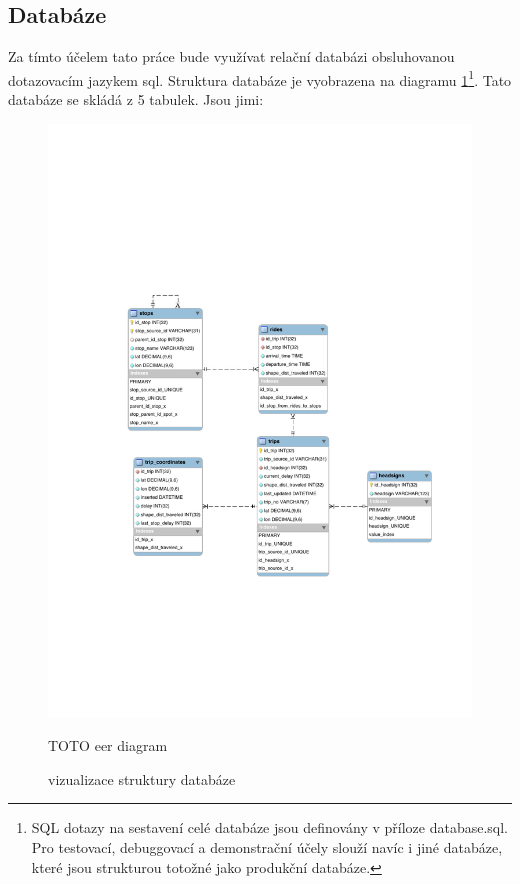 \subsection{Databáze} \label{subsection:databaze}


Za tímto účelem tato práce bude využívat relační databázi obsluhovanou dotazovacím jazykem \gls{sql}. Struktura databáze je vyobrazena na diagramu \ref{obr:EER}\footnote{SQL dotazy na sestavení celé databáze jsou definovány v příloze database.sql. Pro testovací, debuggovací a demonstrační účely slouží navíc i jiné databáze, které jsou strukturou totožné jako produkční databáze.}. Tato databáze se skládá z 5 tabulek. Jsou jimi:




\begin{figure}[p]\centering
\includegraphics[width=\linewidth]{../img/eer_database}
\caption{vizualizace struktury databáze}
\label{obr:EER}


TOTO eer diagram


\end{figure}


